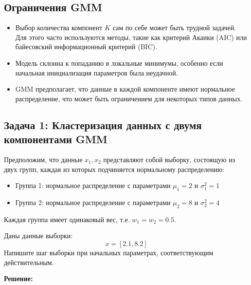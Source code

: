 \subsection{Ограничения GMM}

\begin{itemize}
    \item Выбор количества компонент $K$ сам по себе может быть трудной задачей. Для этого часто используются методы, такие как критерий Акаики (AIC) или байесовский информационный критерий (BIC).
    \item Модель склонна к попаданию в локальные минимумы, особенно если начальная инициализация параметров была неудачной.
    \item GMM предполагает, что данные в каждой компоненте имеют нормальное распределение, что может быть ограничением для некоторых типов данных.
\end{itemize}

\subsection{Задача 1: Кластеризация данных с двумя компонентами GMM}

Предположим, что данные $x_1, x_2$ представляют собой выборку, состоящую из двух групп, каждая из которых подчиняется нормальному распределению:
\begin{itemize}
    \item Группа 1: нормальное распределение с параметрами $\mu_1 = 2$ и $\sigma_1^2 = 1$
    \item Группа 2: нормальное распределение с параметрами $\mu_2 = 8$ и $\sigma_2^2 = 4$
\end{itemize}

Каждая группа имеет одинаковый вес, т.е. $w_1 = w_2 = 0.5$.

Даны данные выборки:
\[
x = [2.1, 8.2]
\]
Напишите шаг выборки при начальных параметрах, соответствующим действительным.
\vspace{0.5cm}

\noindent \textbf{Решение:}

